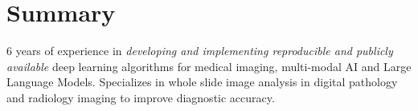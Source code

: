 \section{\textbf{Summary}}

 6 years of experience in \emph{developing and implementing reproducible and publicly available} deep learning algorithms for medical imaging, multi-modal AI and Large Language Models. Specializes in whole slide image analysis in digital pathology and radiology imaging to improve diagnostic accuracy.
